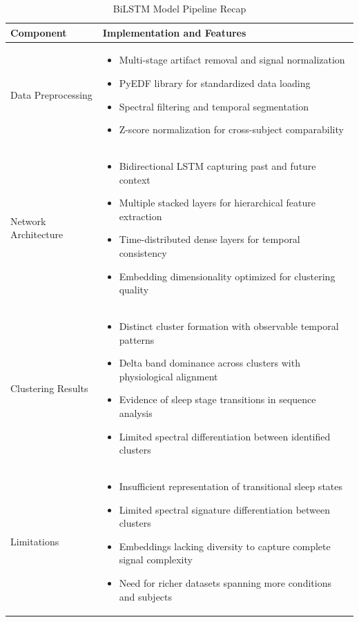 \documentclass[a4paper,12pt,twoside]{article}
\begin{document}
\begin{table}[H]
\centering
\caption{BiLSTM Model Pipeline Recap}
\begin{tabular}{|p{3cm}|p{11cm}|}
\hline
\textbf{Component} & \textbf{Implementation and Features} \\
\hline
Data Preprocessing & 
\begin{itemize}
  \item Multi-stage artifact removal and signal normalization
  \item PyEDF library for standardized data loading
  \item Spectral filtering and temporal segmentation
  \item Z-score normalization for cross-subject comparability
\end{itemize} \\
\hline
Network Architecture & 
\begin{itemize}
  \item Bidirectional LSTM capturing past and future context
  \item Multiple stacked layers for hierarchical feature extraction
  \item Time-distributed dense layers for temporal consistency
  \item Embedding dimensionality optimized for clustering quality
\end{itemize} \\
\hline
Clustering Results & 
\begin{itemize}
  \item Distinct cluster formation with observable temporal patterns
  \item Delta band dominance across clusters with physiological alignment
  \item Evidence of sleep stage transitions in sequence analysis
  \item Limited spectral differentiation between identified clusters
\end{itemize} \\
\hline
Limitations & 
\begin{itemize}
  \item Insufficient representation of transitional sleep states
  \item Limited spectral signature differentiation between clusters
  \item Embeddings lacking diversity to capture complete signal complexity
  \item Need for richer datasets spanning more conditions and subjects
\end{itemize} \\
\hline
\end{tabular}
\label{tab:bilstm_summary}
\end{table}
\end{document}
